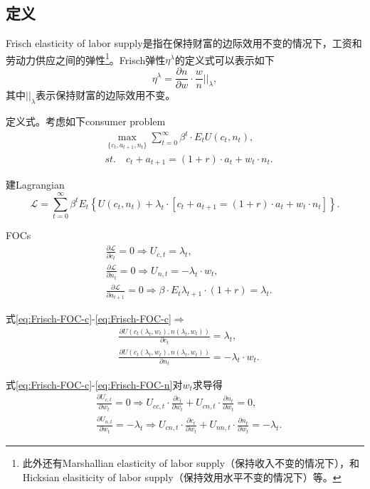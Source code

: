 \begin{subappendices}
\subsection{定义}
Frisch elasticity of labor supply是指在保持财富的边际效用不变的情况下，工资和劳动力供应之间的弹性\citep{Frisch:1932wk}\footnote{此外还有Marshallian elasticity of labor supply（保持收入不变的情况下），和Hicksian elasiticity of labor supply（保持效用水平不变的情况下）等。}。Frisch弹性$\eta^{\lambda}$的定义式可以表示如下
\begin{equation*}
  \eta^{\lambda} = \frac{\partial n}{\partial w} \cdot \frac{w}{n} ||_{\lambda},
\end{equation*}
其中$||_{\lambda}$表示保持财富的边际效用不变。

定义式。考虑如下consumer problem
\begin{align*}
  &\max_{\{c_t,a_{t+1},n_t\}} \sum_{t=0}^{\infty} \beta^t \cdot E_t U(c_t,n_t), \\
    &st. \quad c_t + a_{t+1} = (1+r) \cdot a_t + w_t \cdot n_t.
\end{align*}

建Lagrangian
\begin{equation*}
  \mathcal{L} = \sum_{t=0}^{\infty} \beta^t E_t \left\{U(c_t,n_t) + \lambda_t \cdot \left[c_t + a_{t+1} = (1+r) \cdot a_t + w_t \cdot n_t \right]\right\} .
\end{equation*}

FOCs
\begin{align}
\label{eq:Frisch-FOC-c}
  &\frac{\partial \mathcal{L}}{\partial c_t}=0 \Rightarrow U_{c,t}=\lambda_t,\\
\label{eq:Frisch-FOC-n}
  &\frac{\partial \mathcal{L}}{\partial n_t}=0 \Rightarrow U_{n,t}=-\lambda_t \cdot w_t,\\
\label{eq:Frisch-FOC-a}
  &\frac{\partial \mathcal{L}}{\partial a_{t+1}}=0 \Rightarrow \beta \cdot E_t \lambda_{t+1} \cdot (1+r) =\lambda_t.
\end{align}

式\eqref{eq:Frisch-FOC-c}-\eqref{eq:Frisch-FOC-c}$\Rightarrow$
\begin{align}
\label{eq:Frisch-FOC-c-lambda-w}
  &\frac{\partial U(c_t(\lambda_t, w_t),n(\lambda_t, w_t))}{\partial c_t} = \lambda_t,\\
\label{eq:Frisch-FOC-n-lambda-w}
  &\frac{\partial U(c_t(\lambda_t, w_t),n(\lambda_t, w_t))}{\partial n_t} = -\lambda_t \cdot w_t.
\end{align}

式\eqref{eq:Frisch-FOC-c}-\eqref{eq:Frisch-FOC-n}对$w_t$求导得
\begin{align}
\label{eq:Frisch-FOC-U-c-w}
  &\frac{\partial U_{c,t}}{\partial w_t} = 0 \Rightarrow U_{cc,t} \cdot \frac{\partial c_t}{\partial w_t} + U_{cn,t} \cdot \frac{\partial n_t}{\partial w_t} = 0,\\
\label{eq:Frisch-FOC-U-n-w}
  &\frac{\partial U_{n,t}}{\partial w_t} = -\lambda_t \Rightarrow U_{cn,t} \cdot \frac{\partial c_t}{\partial w_t} + U_{nn,t} \cdot \frac{\partial n_t}{\partial w_t} = -\lambda_t.
\end{align}


\end{subappendices}
